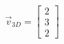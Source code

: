 \documentclass[preview]{standalone}
\begin{document}
\begin{align*}
\vec{v}_{3D} = \begin{bmatrix} 2 \\ 3 \\ 2 \end{bmatrix}
\end{align*}
\end{document}
